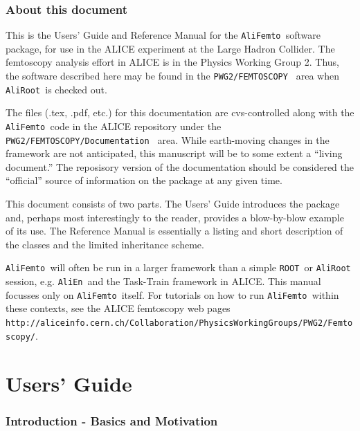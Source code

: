 \documentclass[twoside]{article}
\newcommand{\AliEn}{{\tt AliEn }}
\newcommand{\AliFemto}{{\tt AliFemto }}
\newcommand{\AliRoot}{{\tt AliRoot }}
\newcommand{\ROOT}{{\tt ROOT }}
\begin{document}
%
%


\setcounter{section}{-1}
\section{About this document}

This is the Users' Guide and Reference Manual for the \AliFemto software package,
for use in the ALICE experiment at the Large Hadron Collider.
The femtoscopy analysis effort in ALICE is in the Physics Working Group 2.  Thus,
the software described here may be found in the {\tt PWG2/FEMTOSCOPY } area when
\AliRoot is checked out.

The files (.tex, .pdf, etc.) for this documentation are cvs-controlled along with
the \AliFemto code in the ALICE repository under the {\tt PWG2/FEMTOSCOPY/Documentation } area.
While earth-moving changes in the framework are not anticipated, this manuscript will be to some
extent a ``living document.''  The reposisory version of the documentation
should be considered the ``official'' source of information on the package at any given time.

This document consists of two parts.  The Users' Guide introduces the package and, perhaps most
interestingly to the reader, provides a blow-by-blow example of its use.  The Reference Manual
is essentially a listing and short description of the classes and the limited inheritance
scheme.

\AliFemto will often be run in a larger framework than a simple \ROOT or \AliRoot session, e.g.
\AliEn and the Task-Train framework in ALICE.  This manual focusses only on \AliFemto itself.
For tutorials on how to run \AliFemto within these contexts, see
the ALICE femtoscopy web pages\\
 {\tt http://aliceinfo.cern.ch/Collaboration/PhysicsWorkingGroups/PWG2/Femtoscopy/}.




\clearpage

\part{Users' Guide}
\clearpage


\section{Introduction - Basics and Motivation}
\end{document}
